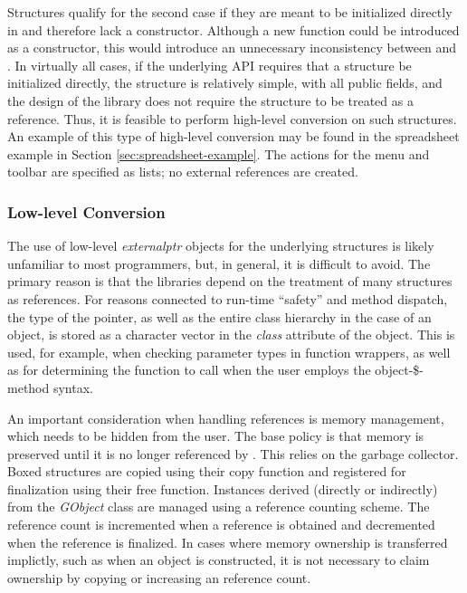 \documentclass[article]{jss}
\begin{document}
Structures qualify for the second case if they are meant to be
initialized directly in  and therefore lack a constructor.
Although a new function could be introduced as a constructor, this
would introduce an unnecessary inconsistency between  and
. In virtually all cases, if the underlying API requires
that a structure be initialized directly, the structure is relatively
simple, with all public fields, and the design of the  library does not require the structure to be treated as a reference. Thus, it is feasible to perform high-level conversion on such structures. An example of this type of high-level conversion may be found in the spreadsheet example in Section \ref{sec:spreadsheet-example}. The actions for the menu and toolbar are specified as lists; no external references are created.

\subsubsection[Low-level Conversion]{Low-level Conversion}

The use of low-level \emph{externalptr} objects for the underlying
 structures is likely unfamiliar to most 
programmers, but, in general, it is difficult to avoid. The primary
reason is that the  libraries depend on the treatment of
many structures as references. For reasons connected to run-time
``safety'' and method dispatch, the type of the pointer, as well as
the entire class hierarchy in the case of an object, is stored as a
character vector in the \emph{class} attribute of the 
object. This is used, for example, when checking parameter types in
function wrappers, as well as for determining the function to call
when the user employs the object-\$-method syntax.

An important consideration when handling references is memory
management, which needs to be hidden from the  user. The
base policy is that memory is preserved until it is no longer
referenced by . This relies on the  garbage
collector. Boxed structures are copied using their copy function and
registered for finalization using their free function. Instances
derived (directly or indirectly) from the \emph{GObject} class are
managed using a reference counting scheme. The reference count is
incremented when a reference is obtained and decremented when the
reference is finalized.  In cases where memory ownership is
transferred implictly, such as when an object is constructed, it is
not necessary to claim ownership by copying or increasing an reference
count.
\end{document}
